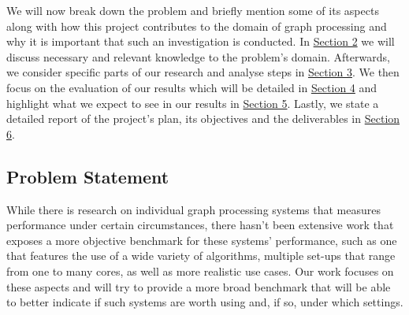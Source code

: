 \documentclass[a4paper,11pt]{article}
\begin{document}
\medskip

\par We will now break down the problem and briefly mention some of its aspects along with how this project contributes to the domain of graph processing and why it is important that such an investigation is conducted. In \hyperref[background]{Section 2} we will discuss necessary and relevant knowledge to the problem's domain. Afterwards, we consider specific parts of our research and analyse steps in \hyperref[methodology]{Section 3}. We then focus on the evaluation of our results which will be detailed in \hyperref[evaluation]{Section 4} and highlight what we expect to see in our results in \hyperref[outcomes]{Section 5}. Lastly, we state a detailed report of the project's plan, its objectives and the deliverables in \hyperref[milestones]{Section 6}.


\subsection{Problem Statement} \label{problem-statement}

\par While there is research on individual graph processing systems that measures performance under certain circumstances, there hasn't been extensive work that exposes a more objective benchmark for these systems' performance, such as one that features the use of a wide variety of algorithms, multiple set-ups that range from one to many cores, as well as more realistic use cases. Our work focuses on these aspects and will try to provide a more broad benchmark that will be able to better indicate if such systems are worth using and, if so, under which settings.

\end{document}
